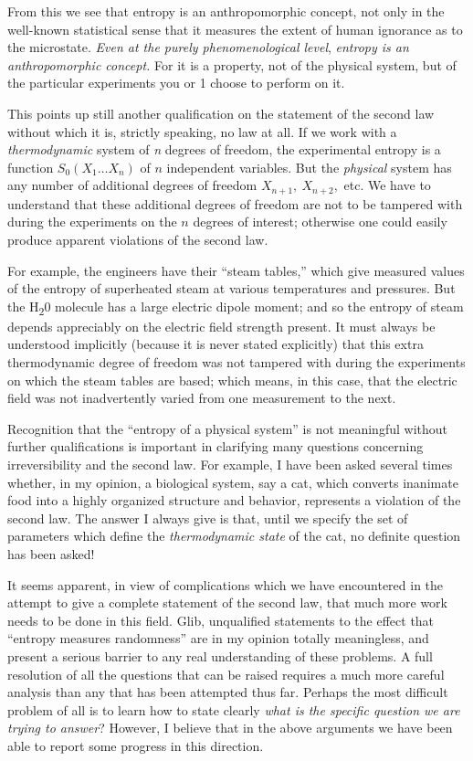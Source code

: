 \documentclass[twocolumn]{article}
\begin{document}
From this we see that entropy is an anthropomorphic concept, not only in
the well-known statistical sense that it measures the extent of human
ignorance as to the microstate. \emph{Even at the purely
phenomenological level}, \emph{entropy is an anthropomorphic concept.}
For it is a property, not of the physical system, but of the particular
experiments you or 1 choose to perform on it.

This points up still another qualification on the statement of the
second law without which it is, strictly speaking, no law at all. If we
work with a \emph{thermodynamic} system of \emph{n} degrees of freedom,
the experimental entropy is a function \(S_{0}(X_{1}\ldots X_{n})\) of
\(n\) independent variables. But the \emph{physical} system has any
number of additional degrees of freedom \(X_{n + 1},\ X_{n + 2},\) etc.
We have to understand that these additional degrees of freedom are not
to be tampered with during the experiments on the \(n\) degrees of
interest; otherwise one could easily produce apparent violations of the
second law.

For example, the engineers have their ``steam tables,'' which give
measured values of the entropy of superheated steam at various
temperatures and pressures. But the H\textsubscript{2}0 molecule has a
large electric dipole moment; and so the entropy of steam depends
appreciably on the electric field strength present. It must always be
understood implicitly (because it is never stated explicitly) that this
extra thermodynamic degree of freedom was not tampered with during the
experiments on which the steam tables are based; which means, in this
case, that the electric field was not inadvertently varied from one
measurement to the next.

Recognition that the ``entropy of a physical system'' is not meaningful
without further qualifications is important in clarifying many questions
concerning irreversibility and the second law. For example, I have been
asked several times whether, in my opinion, a biological system, say a
cat, which converts inanimate food into a highly organized structure and
behavior, represents a violation of the second law. The answer I always
give is that, until we specify the set of parameters which define the
\emph{thermodynamic state} of the cat, no definite question has been
asked!

It seems apparent, in view of complications which we have encountered in
the attempt to give a complete statement of the second law, that much
more work needs to be done in this field. Glib, unqualified statements
to the effect that ``entropy measures randomness'' are in my opinion
totally meaningless, and present a serious barrier to any real
understanding of these problems. A full resolution of all the questions
that can be raised requires a much more careful analysis than any that
has been attempted thus far. Perhaps the most difficult problem of all
is to learn how to state clearly \emph{what is the specific question we
are trying to answer}? However, I believe that in the above arguments we
have been able to report some progress in this direction.
\end{document}

